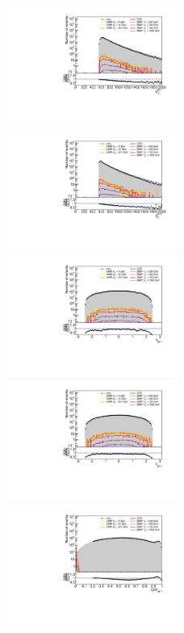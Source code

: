 \begin{figure}[h!]
  \centering
  \includegraphics[width=0.5\textwidth]{figures/jet1_pt_newtrigger}\hfill%
  \includegraphics[width=0.5\textwidth]{figures/jet2_pt_newtrigger}
  \includegraphics[width=0.5\textwidth]{figures/jet1_eta_newtrigger}\hfill%
  \includegraphics[width=0.5\textwidth]{figures/jet2_eta_newtrigger}
  \includegraphics[width=0.5\textwidth]{figures/jet1_chf_newtrigger}\hfill%

\end{figure}
